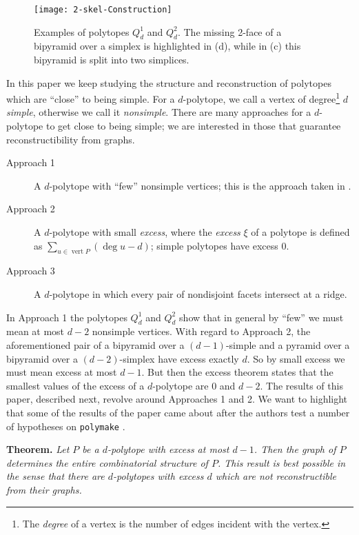 \documentclass[a4paper]{amsart}
\theoremstyle{definition}
\theoremstyle{remark}
\begin{document}
\begin{figure}
\begin{center}
\texttt{[image: 2-skel-Construction]}
\end{center}
\caption{Examples of polytopes $Q_d^1$ and $Q_d^2$. The missing 2-face of a bipyramid over a simplex is highlighted in (d), while in (c) this bipyramid is split into two simplices.}
\label{fig:nonrecontructible-3nonsimple}
\end{figure}
In this paper we keep studying the structure and reconstruction of polytopes which are ``close'' to being simple. For a $d$-polytope, we call a vertex of degree\footnote{The {\it degree} of a vertex is the number of edges incident with the vertex.}  $d$ {\it simple}, otherwise we call it {\it nonsimple}. There are many approaches for a $d$-polytope to get close to being simple;  we are interested in those that guarantee reconstructibility from graphs.  

\begin{description}
\item[Approach 1] A $d$-polytope with ``few'' nonsimple vertices; this is the approach taken in \cite{Doo17,NevPinUgo17}. 
\item[Approach 2] A $d$-polytope with small {\it excess}, where the {\it excess} $\xi$ of a polytope is defined as $\sum_{u\in \operatorname{vert} P} (\deg u-d)$; simple polytopes have excess 0. 

\item[Approach 3] A $d$-polytope in which every pair of nondisjoint facets intersect at a ridge. 
\end{description}
In Approach 1 the polytopes $Q^1_d$ and $Q^2_d$ show that in general by ``few'' we must mean at most $d-2$ nonsimple vertices. With regard to Approach 2, the aforementioned  pair of a bipyramid over a $(d-1)$-simple and a pyramid over a bipyramid over a $(d-2)$-simplex have excess exactly $d$. So by small excess we must mean excess at most $d-1$. But then the excess theorem \cite[Thm.~3.4]{PinUgoYos16a} states that the smallest values of the excess of a $d$-polytope are 0 and $d-2$. The results of this paper, described next, revolve around Approaches 1 and 2. We want to highlight that some of the results of the paper came about after the authors test a number of hypotheses on  \texttt{polymake} \cite{GawJos00} .
 
{\bf Theorem.} {\it Let $P$ be a $d$-polytope with excess at most $d-1$. Then the graph of $P$ determines the entire combinatorial structure of $P$. This result is best possible in the sense that there are $d$-polytopes with excess $d$ which are not reconstructible from their graphs.
}
\end{document}
